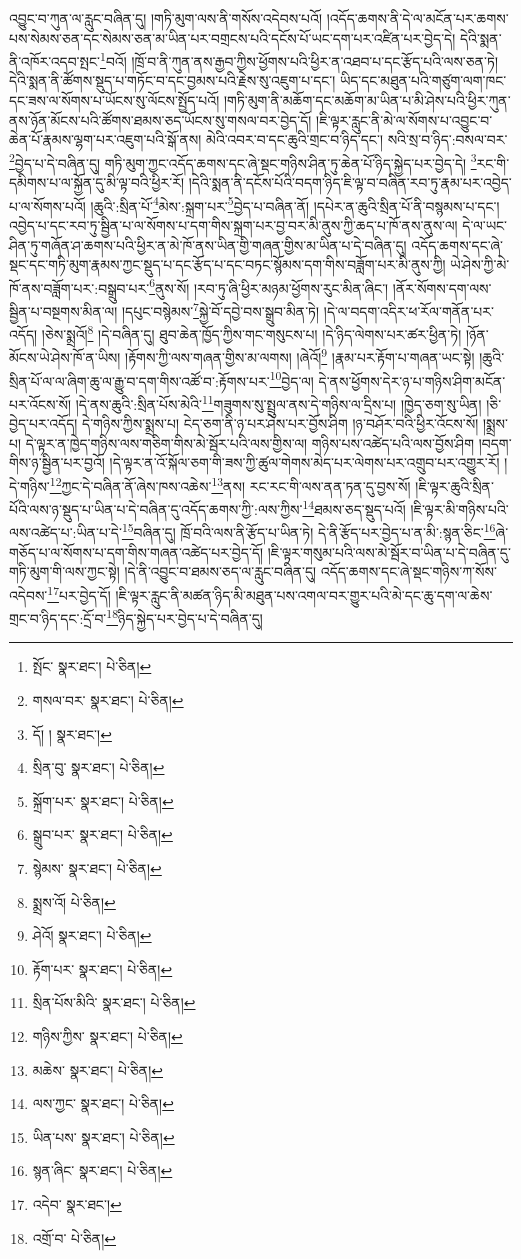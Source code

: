 འབྱུང་བ་ཀུན་ལ་རླུང་བཞིན་དུ། །གཏི་མུག་ལས་ནི་གསོས་འདེབས་པའོ། །འདོད་ཆགས་ནི་དེ་ལ་མངོན་པར་ཆགས་པས་སེམས་ཅན་དང་སེམས་ཅན་མ་ཡིན་པར་བགྲངས་པའི་དངོས་པོ་ཡང་དག་པར་འཛིན་པར་བྱེད་དེ། དེའི་སྨན་ནི་འཁོར་འདབ་སྤང་\footnote{སྤོང་  སྣར་ཐང་།  པེ་ཅིན། }བའོ། །ཁྲོ་བ་ནི་ཀུན་ནས་རྒྱབ་ཀྱིས་ཕྱོགས་པའི་ཕྱིར་ན་འཐབ་པ་དང་རྩོད་པའི་ལས་ཅན་ཏེ། དེའི་སྨན་ནི་ཚོགས་སྡུད་པ་གཏོང་བ་དང་བྱམས་པའི་རྗེས་སུ་འཇུག་པ་དང་། ཡིད་དང་མཐུན་པའི་གཙུག་ལག་ཁང་དང་ཟས་ལ་སོགས་པ་ཡོངས་སུ་ལོངས་སྤྱོད་པའོ། །གཏི་མུག་ནི་མཆོག་དང་མཆོག་མ་ཡིན་པ་མི་ཤེས་པའི་ཕྱིར་ཀུན་ནས་ཉོན་མོངས་པའི་ཚོགས་ཐམས་ཅད་ཡོངས་སུ་གསལ་བར་བྱེད་དོ། །ཇི་ལྟར་རླུང་ནི་མེ་ལ་སོགས་པ་འབྱུང་བ་ཆེན་པོ་རྣམས་ལྷག་པར་འཇུག་པའི་སྒོ་ནས། མེའི་འབར་བ་དང་ཆུའི་གྲང་བ་ཉིད་དང་། སའི་སྲ་བ་ཉིད་:བསལ་བར་\footnote{གསལ་བར་  སྣར་ཐང་།  པེ་ཅིན། }བྱེད་པ་དེ་བཞིན་དུ། གཏི་མུག་ཀྱང་འདོད་ཆགས་དང་ཞེ་སྡང་གཉིས་ཤིན་ཏུ་ཆེན་པོ་ཉིད་སྐྱེད་པར་བྱེད་དེ། \footnote{དོ། །   སྣར་ཐང་། }རང་གི་དམིགས་པ་ལ་སྐྱོན་དུ་མི་ལྟ་བའི་ཕྱིར་རོ། །དེའི་སྨན་ནི་དངོས་པོའི་བདག་ཉིད་ཇི་ལྟ་བ་བཞིན་རབ་ཏུ་རྣམ་པར་འབྱེད་པ་ལ་སོགས་པའོ། །ཆུའི་:སྲིན་པོ་\footnote{སྲིན་བུ་  སྣར་ཐང་།  པེ་ཅིན། }མེས་:སྐྲག་པར་\footnote{སྐྲོག་པར་  སྣར་ཐང་།  པེ་ཅིན། }བྱེད་པ་བཞིན་ནོ། །དཔེར་ན་ཆུའི་སྲིན་པོ་ནི་བསྙམས་པ་དང་། འབྱེད་པ་དང་རབ་ཏུ་སྦྱིན་པ་ལ་སོགས་པ་དག་གིས་སྐྲག་པར་བྱ་བར་མི་ནུས་ཀྱི་ཆད་པ་ཁོ་ནས་ནུས་ལ། དེ་ལ་ཡང་ཤིན་ཏུ་གཞོན་ཤ་ཆགས་པའི་ཕྱིར་ན་མེ་ཁོ་ནས་ཡིན་གྱི་གཞན་གྱིས་མ་ཡིན་པ་དེ་བཞིན་དུ། འདོད་ཆགས་དང་ཞེ་སྡང་དང་གཏི་མུག་རྣམས་ཀྱང་སྡུད་པ་དང་རྩོད་པ་དང་བཏང་སྙོམས་དག་གིས་བཟློག་པར་མི་ནུས་ཀྱི། ཡེ་ཤེས་ཀྱི་མེ་ཁོ་ནས་བཟློག་པར་:བསྒྲུབ་པར་\footnote{སྒྲུབ་པར་  སྣར་ཐང་།  པེ་ཅིན། }ནུས་སོ། །རབ་ཏུ་ཞི་ཕྱིར་མཉམ་ཕྱོགས་རུང་མིན་ཞིང་། །ནོར་སོགས་དག་ལས་སྦྱིན་པ་བསྔགས་མིན་ལ། །དཔུང་བསྙེམས་\footnote{སྙེམས་  སྣར་ཐང་།  པེ་ཅིན། }སྐྱེ་བོ་དབྱེ་བས་སྒྲུབ་མིན་ཏེ། །དེ་ལ་བདག་འདིར་ཕ་རོལ་གནོན་པར་འདོད། །ཅེས་སྨྲའོ།\footnote{སྨྲས་འོ།  པེ་ཅིན། } །དེ་བཞིན་དུ། ཐུབ་ཆེན་ཁྱོད་ཀྱིས་གང་གསུངས་པ། །དེ་ཉིད་ལེགས་པར་ཚར་ཕྱིན་ཏེ། །ཉོན་མོངས་ཡེ་ཤེས་ཁོ་ན་ཡིས། །རྟོགས་ཀྱི་ལས་གཞན་གྱིས་མ་ལགས། །ཞེའོ།\footnote{ཤེའོ།  སྣར་ཐང་།  པེ་ཅིན། } །རྣམ་པར་རྟོག་པ་གཞན་ཡང་སྟེ། །ཆུའི་སྲིན་པོ་ལ་ལ་ཞིག་ཆུ་ལ་རྒྱུ་བ་དག་གིས་འཚོ་བ་:རྟོགས་པར་\footnote{རྟོག་པར་  སྣར་ཐང་།  པེ་ཅིན། }བྱེད་ལ། དེ་ནས་ཕྱོགས་དེར་ཉ་པ་གཉིས་ཤིག་མངོན་པར་འོངས་སོ། །དེ་ནས་ཆུའི་:སྲིན་པོས་མེའི་\footnote{སྲིན་པོས་མིའི་  སྣར་ཐང་།  པེ་ཅིན། }གཟུགས་སུ་སྤྲུལ་ནས་དེ་གཉིས་ལ་དྲིས་པ། །ཁྱེད་ཅག་སུ་ཡིན། །ཅི་བྱེད་པར་འདོད། དེ་གཉིས་ཀྱིས་སྨྲས་པ། ངེད་ཅག་ནི་ཉ་པར་ཤེས་པར་བྱོས་ཤིག །ཉ་བཤོར་བའི་ཕྱིར་འོངས་སོ། །སྨྲས་པ། དེ་ལྟར་ན་ཁྱེད་གཉིས་ལས་གཅིག་གིས་མེ་སྦོར་པའི་ལས་གྱིས་ལ། གཉིས་པས་འཚེད་པའི་ལས་བྱོས་ཤིག །བདག་གིས་ཉ་སྦྱིན་པར་བྱའོ། །དེ་ལྟར་ན་འོ་སྐོལ་ཅག་གི་ཟས་ཀྱི་ཚུལ་གེགས་མེད་པར་ལེགས་པར་འགྲུབ་པར་འགྱུར་རོ། །དེ་གཉིས་\footnote{གཉིས་ཀྱིས་  སྣར་ཐང་།  པེ་ཅིན། }ཀྱང་དེ་བཞིན་ནོ་ཞེས་ཁས་འཆེས་\footnote{མཆེས་  སྣར་ཐང་།  པེ་ཅིན། }ནས། རང་རང་གི་ལས་ནན་ཏན་དུ་བྱས་སོ། །ཇི་ལྟར་ཆུའི་སྲིན་པོའི་ལས་ཉ་སྡུད་པ་ཡིན་པ་དེ་བཞིན་དུ་འདོད་ཆགས་ཀྱི་:ལས་ཀྱིས་\footnote{ལས་ཀྱང་  སྣར་ཐང་།  པེ་ཅིན། }ཐམས་ཅད་སྡུད་པའོ། །ཇི་ལྟར་མི་གཉིས་པའི་ལས་འཚེད་པ་:ཡིན་པ་དེ་\footnote{ཡིན་པས་  སྣར་ཐང་།  པེ་ཅིན། }བཞིན་དུ། ཁྲོ་བའི་ལས་ནི་རྩོད་པ་ཡིན་ཏེ། དེ་ནི་རྩོད་པར་བྱེད་པ་ན་མི་:སྙན་ཅིང་\footnote{སྙན་ཞིང་  སྣར་ཐང་།  པེ་ཅིན། }ཞེ་གཅོད་པ་ལ་སོགས་པ་དག་གིས་གཞན་འཚེད་པར་བྱེད་དོ། །ཇི་ལྟར་གསུམ་པའི་ལས་མེ་སྦོར་བ་ཡིན་པ་དེ་བཞིན་དུ་གཏི་མུག་གི་ལས་ཀྱང་སྟེ། །དེ་ནི་འབྱུང་བ་ཐམས་ཅད་ལ་རླུང་བཞིན་དུ། འདོད་ཆགས་དང་ཞེ་སྡང་གཉིས་ཀ་སོས་འདེབས་\footnote{འདེབ་  སྣར་ཐང་། }པར་བྱེད་དོ། །ཇི་ལྟར་རླུང་ནི་མཚན་ཉིད་མི་མཐུན་པས་འགལ་བར་གྱུར་པའི་མེ་དང་ཆུ་དག་ལ་ཆེས་གྲང་བ་ཉིད་དང་:དྲོ་བ་\footnote{འགྲོ་བ་  པེ་ཅིན། }ཉིད་སྐྱེད་པར་བྱེད་པ་དེ་བཞིན་དུ། 